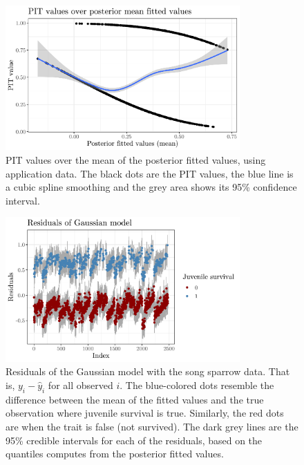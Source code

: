 \begin{figure}
    \centering
    \includegraphics[width=0.8\textwidth]{figures/PIT-over-fitted.pdf}
    \caption[Gaussian model PIT vs fitted values in application]{PIT values over the mean of the posterior fitted values, using application data. The black dots are the PIT values, the blue line is a cubic spline smoothing and the grey area shows its 95\% confidence interval.}
    \label{fig:gaussian pit vs fitted}
\end{figure}

\begin{figure}
    \centering
    \includegraphics[width=0.8\textwidth]{figures/Residuals-gaussian.pdf}
    \caption[Residuals in Gaussian model, using simulation data]{Residuals of the Gaussian model with the song sparrow data. That is, $y_i-\hat y_i$ for all observed $i$. The blue-colored dots resemble the difference between the mean of the fitted values and the true observation where juvenile survival is true. Similarly, the red dots are when the trait is false (not survived). The dark grey lines are the 95\% credible intervals for each of the residuals, based on the quantiles computes from the posterior fitted values.}
    \label{fig:gaussian residuals}
\end{figure}

